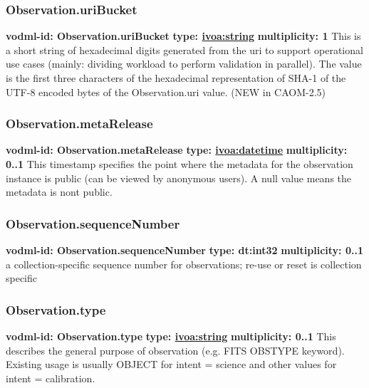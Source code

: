     \subsubsection{Observation.uriBucket}
      \textbf{vodml-id: Observation.uriBucket} \newline
      \textbf{type: \hyperref[sect:ivoa]{ivoa:string}} \newline
      \textbf{multiplicity: 1} \newline
      This is a short string of hexadecimal digits generated from the uri to support operational use cases (mainly: dividing workload to perform validation in parallel). The value is the first three characters of the hexadecimal representation of SHA-1 of the UTF-8 encoded bytes of the Observation.uri value. (NEW in CAOM-2.5)

    \subsubsection{Observation.metaRelease}
      \textbf{vodml-id: Observation.metaRelease} \newline
      \textbf{type: \hyperref[sect:ivoa]{ivoa:datetime}} \newline
      \textbf{multiplicity: 0..1} \newline
      This timestamp specifies the point where the metadata for the observation instance is public (can be viewed by anonymous users). A null value means the metadata is nont public.

    \subsubsection{Observation.sequenceNumber}
      \textbf{vodml-id: Observation.sequenceNumber} \newline
      \textbf{type: dt:int32} \newline
      \textbf{multiplicity: 0..1} \newline
      a collection-specific sequence number for observations; re-use or reset is collection specific

    \subsubsection{Observation.type}
      \textbf{vodml-id: Observation.type} \newline
      \textbf{type: \hyperref[sect:ivoa]{ivoa:string}} \newline
      \textbf{multiplicity: 0..1} \newline
      This describes the general purpose of observation (e.g. FITS OBSTYPE keyword). Existing usage is usually OBJECT for intent = science and other values for intent = calibration.

